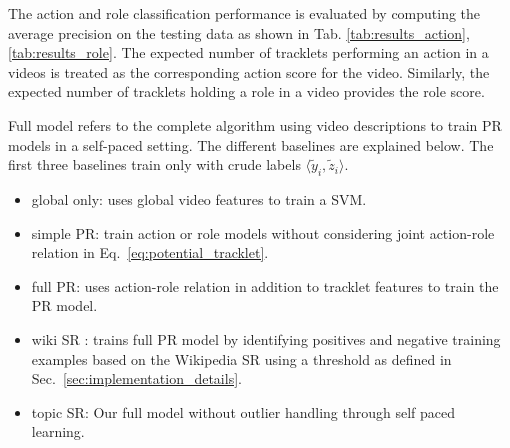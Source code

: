 \documentclass[10pt,twocolumn,letterpaper]{article}
\begin{document}
The action and role classification performance is evaluated by computing the average precision 
on the testing data as shown in Tab. \ref{tab:results_action}, \ref{tab:results_role}. The expected number of tracklets performing an action in a videos is treated as the corresponding action score for the video. Similarly, the expected number of tracklets holding a role in a video provides the role score. 

Full model refers to the complete algorithm using video descriptions to train
PR models in a self-paced setting. The different baselines are explained below.
The first three baselines train only with crude labels $\langle \tilde{y}_i, \tilde{z}_i \rangle$.

\vspace*{-5pt}
\begin{itemize}
 \item global only: uses global video features to train a SVM.\vspace*{-7pt}
 \item simple PR: train action or role models without considering joint action-role relation in Eq.~\ref{eq:potential_tracklet}.\vspace*{-7pt}
 \item full PR: uses action-role relation in addition to tracklet features to train the PR model.\vspace*{-7pt}
 \item wiki SR \cite{Rohrbach_CVPR10}: trains full PR model by identifying positives and negative training examples based on the Wikipedia SR using a threshold as defined in Sec.~\ref{sec:implementation_details}.\vspace*{-7pt}
 \item topic SR: Our full model without outlier handling through self paced learning. \vspace*{-3pt} 
\end{itemize}
\end{document}
